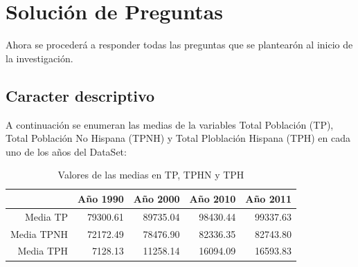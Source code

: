 \documentclass[conference]{IEEEtran}\usepackage[]{graphicx}\usepackage[]{color}
\begin{document}
	

\section{Solución de Preguntas}
Ahora se procederá a responder todas las preguntas que se plantearón al inicio de la investigación.



\subsection{Caracter descriptivo}


A continuación se enumeran las medias de la variables Total Población (TP), Total Población  No Hispana (TPNH) y Total Ploblación Hispana (TPH) en cada uno de los años del DataSet:

\begin{table}[ht]
\centering
\begin{tabular}{rrrrr}
  \hline
 & Año 1990 & Año 2000 & Año 2010 & Año 2011 \\ 
  \hline
Media TP & 79300.61 & 89735.04 & 98430.44 & 99337.63 \\ 
  Media TPNH & 72172.49 & 78476.90 & 82336.35 & 82743.80 \\ 
  Media TPH & 7128.13 & 11258.14 & 16094.09 & 16593.83 \\ 
   \hline
\end{tabular}
\caption{Valores de las medias en TP, TPHN y TPH} 
\end{table}
\end{document}
